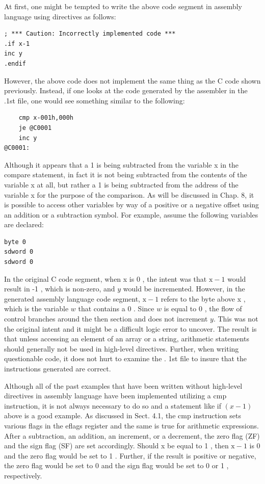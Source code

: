 \documentclass[10pt]{article}
\begin{document}
At first, one might be tempted to write the above code segment in assembly language using directives as follows:

\begin{verbatim}
; *** Caution: Incorrectly implemented code ***
.if x-1
inc y
.endif
\end{verbatim}

However, the above code does not implement the same thing as the C code shown previously. Instead, if one looks at the code generated by the assembler in the .1st file, one would see something similar to the following:

\begin{verbatim}
    cmp x-001h,000h
    je @C0001
    inc y
@C0001:
\end{verbatim}

Although it appears that a 1 is being subtracted from the variable x in the compare statement, in fact it is not being subtracted from the contents of the variable x at all, but rather a 1 is being subtracted from the address of the variable x for the purpose of the comparison. As will be discussed in Chap. 8, it is possible to access other variables by way of a positive or a negative offset using an addition or a subtraction symbol. For example, assume the following variables are declared:

\begin{verbatim}
byte 0
sdword 0
sdword 0
\end{verbatim}

In the original C code segment, when x is 0 , the intent was that $\mathrm{x}-1$ would result in -1 , which is non-zero, and $y$ would be incremented. However, in the generated assembly language code segment, $\mathrm{x}-1$ refers to the byte above x , which is the variable $w$ that contains a 0 . Since $w$ is equal to 0 , the flow of control branches around the then section and does not increment $y$. This was not the original intent and it might be a difficult logic error to uncover. The result is that unless accessing an element of an array or a string, arithmetic statements should generally not be used in high-level directives. Further, when writing questionable code, it does not hurt to examine the . 1st file to insure that the instructions generated are correct.

Although all of the past examples that have been written without high-level directives in assembly language have been implemented utilizing a cmp instruction, it is not always necessary to do so and a statement like if $(x-1)$ above is a good example. As discussed in Sect. 4.1, the cmp instruction sets various flags in the eflags register and the same is true for arithmetic expressions. After a subtraction, an addition, an increment, or a decrement, the zero flag (ZF) and the sign flag (SF) are set accordingly. Should x be equal to 1 , then $\mathrm{x}-1$ is 0 and the zero flag would be set to 1 . Further, if the result is positive or negative, the zero flag would be set to 0 and the sign flag would be set to 0 or 1 , respectively.
\end{document}
